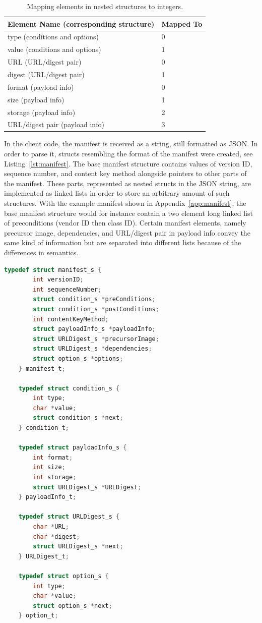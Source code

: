 \documentclass[0-thesis.tex]{subfiles}
\begin{document}
\begin{longtable}[]{@{}ll@{}}
    \caption{Mapping elements in nested structures to integers.}
    \label{tab:nested-substitution}\\
    \toprule
    Element Name (corresponding structure) & Mapped To\tabularnewline
    \midrule
    \endhead
    type (conditions and options) & 0\tabularnewline
    value (conditions and options) & 1\tabularnewline
    \bottomrule
    URL (URL/digest pair) & 0\tabularnewline
    digest (URL/digest pair) & 1\tabularnewline
    \bottomrule
    format (payload info) & 0\tabularnewline
    size (payload info) & 1\tabularnewline
    storage (payload info) & 2\tabularnewline
    URL/digest pair (payload info) & 3\tabularnewline
    \bottomrule
\end{longtable}

In the client code, the manifest is received as a string, still formatted as JSON. In
order to parse it, structs resembling the format of the manifest were created, see
Listing~\ref{lst:manifest}. The base manifest structure contains values of version ID,
sequence number, and content key method alongside pointers to other parts of the manifest.
These parts, represented as nested structs in the JSON string, are implemented as linked
lists in order to store an arbitrary amount of such structures. With the example manifest
shown in Appendix~\ref{app:manifest}, the base manifest structure would for instance
contain a two element long linked list of preconditions (vendor ID then class ID). Certain
manifest elements, namely precursor image, dependencies, and URL/digest pair in payload
info convey the same kind of information but are separated into different lists because of
the differences in semantics.

\begin{lstlisting}[language=c, caption={The client manifest implementation}, label=lst:manifest]
    typedef struct manifest_s {
        int versionID;
        int sequenceNumber;
        struct condition_s *preConditions;
        struct condition_s *postConditions;
        int contentKeyMethod;
        struct payloadInfo_s *payloadInfo;
        struct URLDigest_s *precursorImage;
        struct URLDigest_s *dependencies;
        struct option_s *options;
    } manifest_t;

    typedef struct condition_s {
        int type;
        char *value;
        struct condition_s *next;
    } condition_t;

    typedef struct payloadInfo_s {
        int format;
        int size;
        int storage;
        struct URLDigest_s *URLDigest;
    } payloadInfo_t;

    typedef struct URLDigest_s {
        char *URL;
        char *digest;
        struct URLDigest_s *next;
    } URLDigest_t;

    typedef struct option_s {
        int type;
        char *value;
        struct option_s *next;
    } option_t;
\end{lstlisting}
\end{document}
